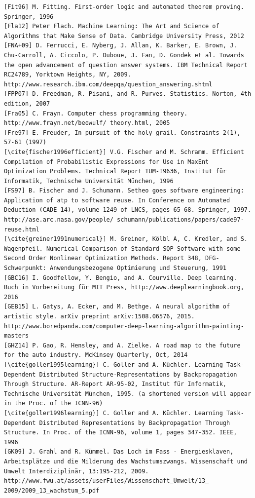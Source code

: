 \documentclass[10pt]{article}
\begin{document}
\begin{verbatim}
[Fit96] M. Fitting. First-order logic and automated theorem proving. Springer, 1996
[Fla12] Peter Flach. Machine Learning: The Art and Science of Algorithms that Make Sense of Data. Cambridge University Press, 2012
[FNA+09] D. Ferrucci, E. Nyberg, J. Allan, K. Barker, E. Brown, J. Chu-Carroll, A. Ciccolo, P. Duboue, J. Fan, D. Gondek et al. Towards the open advancement of question answer systems. IBM Technical Report RC24789, Yorktown Heights, NY, 2009. http://www.research.ibm.com/deepqa/question_answering.shtml
[FPP07] D. Freedman, R. Pisani, and R. Purves. Statistics. Norton, 4th edition, 2007
[Fra05] C. Frayn. Computer chess programming theory. http://www.frayn.net/beowulf/ theory.html, 2005
[Fre97] E. Freuder, In pursuit of the holy grail. Constraints 2(1), 57-61 (1997)
[\cite{fischer1996efficient}] V.G. Fischer and M. Schramm. Efficient Compilation of Probabilistic Expressions for Use in MaxEnt Optimization Problems. Technical Report TUM-I9636, Institut für Informatik, Technische Universität München, 1996
[FS97] B. Fischer and J. Schumann. Setheo goes software engineering: Application of atp to software reuse. In Conference on Automated Deduction (CADE-14), volume 1249 of LNCS, pages 65-68. Springer, 1997. http://ase.arc.nasa.gov/people/ schumann/publications/papers/cade97-reuse.html
[\cite{greiner1991numerical}] M. Greiner, Kölbl A, C. Kredler, and S. Wagenpfeil. Numerical Comparison of Standard SQP-Software with some Second Order Nonlinear Optimization Methods. Report 348, DFG-Schwerpunkt: Anwendungsbezogene Optimierung und Steuerung, 1991
[GBC16] I. Goodfellow, Y. Bengio, and A. Courville. Deep learning. Buch in Vorbereitung für MIT Press, http://www.deeplearningbook.org, 2016
[GEB15] L. Gatys, A. Ecker, and M. Bethge. A neural algorithm of artistic style. arXiv preprint arXiv:1508.06576, 2015. http://www.boredpanda.com/computer-deep-learning-algorithm-painting-masters
[GHZ14] P. Gao, R. Hensley, and A. Zielke. A road map to the future for the auto industry. McKinsey Quarterly, Oct, 2014
[\cite{goller1995learning}] C. Goller and A. Küchler. Learning Task-Dependent Distributed Structure-Representations by Backpropagation Through Structure. AR-Report AR-95-02, Institut für Informatik, Technische Universität München, 1995. (a shortened version will appear in the Proc. of the ICNN-96)
[\cite{goller1996learning}] C. Goller and A. Küchler. Learning Task-Dependent Distributed Representations by Backpropagation Through Structure. In Proc. of the ICNN-96, volume 1, pages 347-352. IEEE, 1996
[GK09] J. Grahl and R. Kümmel. Das Loch im Fass - Energiesklaven, Arbeitsplätze und die Milderung des Wachstumszwangs. Wissenschaft und Umwelt Interdiziplinär, 13:195-212, 2009. http://www.fwu.at/assets/userFiles/Wissenschaft_Umwelt/13_ 2009/2009_13_wachstum_5.pdf

\end{verbatim}
\end{document}

